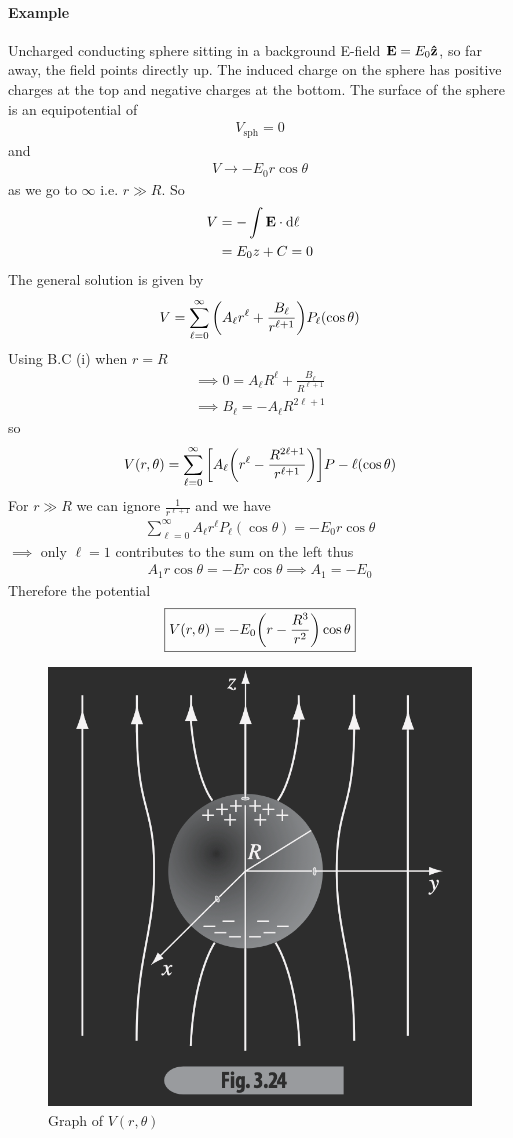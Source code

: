 \documentclass[../main.tex]{subfiles}
\begin{document}
\paragraph{Example} Uncharged conducting sphere sitting in a background E-field $\vb E = E_0 \vu z$, so far away, the field points directly up.
The induced charge on the sphere has positive charges at the top and negative charges at the bottom.
The surface of the sphere is an equipotential of
\begin{align*}
    V_\text{sph} = 0
\end{align*}
and 
\begin{align*}
    V\to -E_0 r\cos\theta
\end{align*}
as we go to $\infty$ i.e. $r \gg R$. So
\begin{align*}
    V &= - \int \vb E \cdot \dd \ell  \\
    &= E_0 z  + C = 0
\end{align*} 
The general solution is given by
\begin{align*}
    V = \sum_{\ell = 0}^\infty \qt(A_\ell r^\ell + \frac{B_\ell}{r^{\ell + 1}}) P_\ell(\cos\theta)
\end{align*}
Using B.C (i) when $r = R$
\begin{align*}
    \implies 0 = A_\ell R^\ell + \frac{B_\ell}{R^{\ell + 1}} \\
    \implies B_\ell = -A_\ell R^{2\ell + 1}
\end{align*} 
so
\begin{align*}
    V(r,\theta) = \sum_{\ell = 0}^\infty \qt[
        A_\ell \qt(
            r^\ell - \frac{R^{2\ell + 1}}{r^{\ell + 1}}
        )
    ] P-\ell(\cos\theta)
\end{align*}
For $r \gg R$ we can ignore $\frac{1}{r^{\ell + 1}}$ and we have
\begin{align*}
    \sum_{\ell = 0}^\infty A_\ell r^\ell P_\ell(\cos\theta) = -E_0 r \cos\theta 
\end{align*}
$\implies$ only $\ell = 1$ contributes to the sum on the left thus
\begin{align*}
    A_1 r \cos\theta = -E r \cos\theta \implies A_1 = -E_0
\end{align*}
Therefore the potential
\begin{align*}
    \boxed{
        V(r,\theta) = -E_0 \qt(
            r - \frac{R^3}{r^2}
        ) \cos\theta
    }
\end{align*}
\begin{figure}
    \centering
    \includegraphics[width=0.4\linewidth]{fig3_24.png}
    \caption{Graph of $V(r,\theta)$}
    \label{fig:lecture3_24}
\end{figure}
\end{document}
